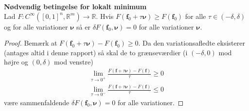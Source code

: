 \begin{thm} {\bf Nødvendig betingelse for lokalt minimum}\\
Lad $F : C^\infty ([0,1]^n, \mathbb{R}^m) \to \mathbb{R}$. Hvis $F(\mathbf{f}_0+\tau {\boldsymbol \nu}) \geq F(\mathbf{f}_0)$ for alle $\tau\in (-\delta, \delta)$ og for alle variationer ${\boldsymbol \nu}$ så er $\delta F(\mathbf{f}_0, {\boldsymbol \nu})=0$ for alle variationer ${\boldsymbol \nu}$.
\end{thm}
\begin{proof} Bemærk at $F(\mathbf{f}_0+\tau {\boldsymbol \nu}) - F(\mathbf{f}_0) \geq 0$. Da den variationsafledte eksisterer (antages altid i denne rapport) så skal de to grænseværdier (i $(-\delta,0)$ mod højre og $(0,\delta)$ mod venstre)
\begin{align*}
\lim_{\tau \to 0^+} \frac{F(\mathbf{f}+\tau{\boldsymbol \nu})-F(\mathbf{f})}{\tau} \geq 0 \\
\lim_{\tau \to 0^-} \frac{F(\mathbf{f}+\tau{\boldsymbol \nu})-F(\mathbf{f})}{\tau} \leq 0
\end{align*}
være sammenfaldende $\delta F(\mathbf{f}_0, {\boldsymbol \nu})=0$ for alle variationer.
\end{proof}



